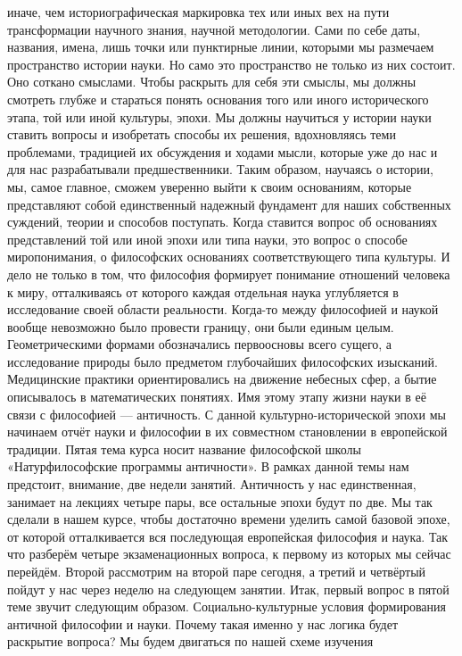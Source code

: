 иначе, чем историографическая маркировка тех или иных вех на пути трансформации
научного знания, научной методологии. Сами по себе даты, названия, имена, лишь
точки или пунктирные линии, которыми мы размечаем пространство истории науки. Но
само это пространство не только из них состоит. Оно соткано смыслами. Чтобы
раскрыть для себя эти смыслы, мы должны смотреть глубже и стараться понять
основания того или иного исторического этапа, той или иной культуры, эпохи. Мы
должны научиться у истории науки ставить вопросы и изобретать способы их
решения, вдохновляясь теми проблемами, традицией их обсуждения и ходами мысли,
которые уже до нас и для нас разрабатывали предшественники. Таким образом,
научаясь о истории, мы, самое главное, сможем уверенно выйти к своим основаниям,
которые представляют собой единственный надежный фундамент для наших собственных
суждений, теории и способов поступать. Когда ставится вопрос об основаниях
представлений той или иной эпохи или типа науки, это вопрос о способе
миропонимания, о философских основаниях соответствующего типа культуры. И дело
не только в том, что философия формирует понимание отношений человека к миру,
отталкиваясь от которого каждая отдельная наука углубляется в исследование своей
области реальности. Когда-то между философией и наукой вообще невозможно было
провести границу, они были единым целым. Геометрическими формами обозначались
первоосновы всего сущего, а исследование природы было предметом глубочайших
философских изысканий. Медицинские практики ориентировались на движение небесных
сфер, а бытие описывалось в математических понятиях. Имя этому этапу жизни науки
в её связи с философией — античность. С данной культурно-исторической эпохи мы
начинаем отчёт науки и философии в их совместном становлении в европейской
традиции. Пятая тема курса носит название философской школы «Натурфилософские
программы античности». В рамках данной темы нам предстоит, внимание, две недели
занятий. Античность у нас единственная, занимает на лекциях четыре пары, все
остальные эпохи будут по две. Мы так сделали в нашем курсе, чтобы достаточно
времени уделить самой базовой эпохе, от которой отталкивается вся последующая
европейская философия и наука. Так что разберём четыре экзаменационных вопроса,
к первому из которых мы сейчас перейдём. Второй рассмотрим на второй паре
сегодня, а третий и четвёртый пойдут у нас через неделю на следующем занятии.
Итак, первый вопрос в пятой теме звучит следующим образом. Социально-культурные
условия формирования античной философии и науки. Почему такая именно у нас
логика будет раскрытие вопроса? Мы будем двигаться по нашей схеме изучения
